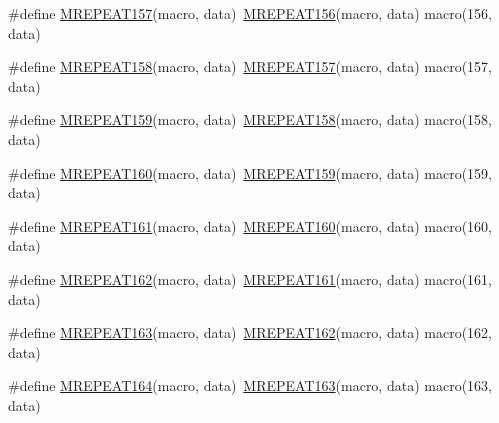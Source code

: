\begin{DoxyCompactItemize}
\item 
\#define \mbox{\hyperlink{group__group__sam0__utils__mrepeat_gac6c7099162fd3b9ad60c2e4ff69b6bf1}{M\+R\+E\+P\+E\+A\+T157}}(macro,  data)~\mbox{\hyperlink{group__group__sam0__utils__mrepeat_ga4608d896f8fb7879075ba32ad5b687f9}{M\+R\+E\+P\+E\+A\+T156}}(macro, data)   macro(156, data)
\item 
\#define \mbox{\hyperlink{group__group__sam0__utils__mrepeat_ga76360eeb95fe2f07db4e54f3b56c3fef}{M\+R\+E\+P\+E\+A\+T158}}(macro,  data)~\mbox{\hyperlink{group__group__sam0__utils__mrepeat_gac6c7099162fd3b9ad60c2e4ff69b6bf1}{M\+R\+E\+P\+E\+A\+T157}}(macro, data)   macro(157, data)
\item 
\#define \mbox{\hyperlink{group__group__sam0__utils__mrepeat_ga0ffc3b60afa702e0588da2e00ddb9e7e}{M\+R\+E\+P\+E\+A\+T159}}(macro,  data)~\mbox{\hyperlink{group__group__sam0__utils__mrepeat_ga76360eeb95fe2f07db4e54f3b56c3fef}{M\+R\+E\+P\+E\+A\+T158}}(macro, data)   macro(158, data)
\item 
\#define \mbox{\hyperlink{group__group__sam0__utils__mrepeat_gad1af2da931db2624f37a6357de14bc12}{M\+R\+E\+P\+E\+A\+T160}}(macro,  data)~\mbox{\hyperlink{group__group__sam0__utils__mrepeat_ga0ffc3b60afa702e0588da2e00ddb9e7e}{M\+R\+E\+P\+E\+A\+T159}}(macro, data)   macro(159, data)
\item 
\#define \mbox{\hyperlink{group__group__sam0__utils__mrepeat_ga8c32111637f7d8420f239a6de681667c}{M\+R\+E\+P\+E\+A\+T161}}(macro,  data)~\mbox{\hyperlink{group__group__sam0__utils__mrepeat_gad1af2da931db2624f37a6357de14bc12}{M\+R\+E\+P\+E\+A\+T160}}(macro, data)   macro(160, data)
\item 
\#define \mbox{\hyperlink{group__group__sam0__utils__mrepeat_ga24cbd158a09a6694b3578c3332dbe324}{M\+R\+E\+P\+E\+A\+T162}}(macro,  data)~\mbox{\hyperlink{group__group__sam0__utils__mrepeat_ga8c32111637f7d8420f239a6de681667c}{M\+R\+E\+P\+E\+A\+T161}}(macro, data)   macro(161, data)
\item 
\#define \mbox{\hyperlink{group__group__sam0__utils__mrepeat_ga24257587ba592ff6daf20d7ccc16d3a1}{M\+R\+E\+P\+E\+A\+T163}}(macro,  data)~\mbox{\hyperlink{group__group__sam0__utils__mrepeat_ga24cbd158a09a6694b3578c3332dbe324}{M\+R\+E\+P\+E\+A\+T162}}(macro, data)   macro(162, data)
\item 
\#define \mbox{\hyperlink{group__group__sam0__utils__mrepeat_ga5635a788c18814a98cca65d80c06dbfb}{M\+R\+E\+P\+E\+A\+T164}}(macro,  data)~\mbox{\hyperlink{group__group__sam0__utils__mrepeat_ga24257587ba592ff6daf20d7ccc16d3a1}{M\+R\+E\+P\+E\+A\+T163}}(macro, data)   macro(163, data)

\end{DoxyCompactItemize}
